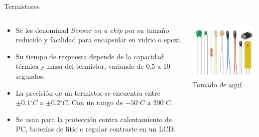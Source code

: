 \documentclass[aspectratio=169]{beamer}
\begin{document}
\begin{frame}{Termistores}
    \begin{columns}[c, onlytextwidth]
        \begin{column}{0.55\textwidth}
            \begin{itemize}
                \item Se les denominad \textit{Sensor on a chip} por su tamaño reducido y facilidad para encapsular en vidrio o epoxi.
                \item Su tiempo de respuesta depende de la capacidad térmica y masa del termistor, variando de 0,5 a 10 segundos.  
                \item La precisión de un termistor se encuentra entre $\pm 0.1 {^\circ} C$ a $\pm 0.2 {^\circ} C$. Con un rango de $-50 {^\circ} C$ a $200 {^\circ} C$.
                \item Se usan para la protección contra calentamiento de PC, baterías de litio o regular contraste en un LCD. 
            \end{itemize}
        \end{column}
        \begin{column}{0.40\textwidth}
           \includegraphics[width=6.5cm]{fig/Thermistor_type.PNG}
            \\ \tiny{Tomado de \href{https://es.made-in-china.com/co_jpsensor/product_Ntc-10K-Thermistor-Collection_reeeohegg.html}{aquí}}
        \end{column}
    \end{columns}
\end{frame}
\end{document}
